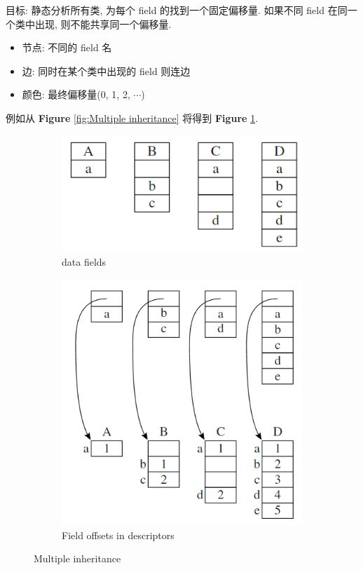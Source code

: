 目标: 静态分析所有类, 为每个 field 的找到一个固定偏移量. 如果不同 field 在同一个类中出现, 则不能共享同一个偏移量. 
\begin{itemize}
    \item 节点: 不同的 field 名
    \item 边: 同时在某个类中出现的 field 则连边
    \item 颜色: 最终偏移量(0, 1, 2, $\cdots$)
\end{itemize}

例如从 \textbf{Figure} \ref{fig:Multiple inheritance} 将得到 \textbf{Figure} \ref{fig:Multiple inheritance of data fields}.

\begin{figure}[H]
    \centering
    \begin{subfigure}{0.48\linewidth}
        \centering
        \includegraphics[width=\linewidth]{pic/CP14/Multiple inheritance of data fields}
        \caption{data fields}
        \label{fig:Multiple inheritance of data fields}
    \end{subfigure}
    \begin{subfigure}{0.48\linewidth}
        \centering
        \includegraphics[width=0.65\linewidth]{pic/CP14/Field offsets in descriptors}
    \caption{Field offsets in descriptors}
    \label{fig:Field offsets in descriptors}
    \end{subfigure}
    \caption{Multiple inheritance}
\end{figure}


